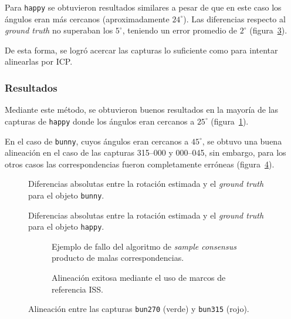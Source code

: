 			Para \texttt{happy} se obtuvieron resultados similares a pesar de que en este
			caso los ángulos eran más cercanos (aproximadamente $24^{\circ}$).  Las
			diferencias respecto al \emph{ground truth} no superaban los $5^{\circ}$,
			teniendo un error promedio de $2^{\circ}$ (figura~\ref{fig:clust_happy}).

			De esta forma, se logró acercar las capturas lo suficiente como
			para intentar alinearlas por ICP.

		\subsubsection{Resultados} %
			Mediante este método, se obtuvieron buenos resultados en la mayoría de las
			capturas de \texttt{happy}
			donde los ángulos eran cercanos a $25^{\circ}$ (figura~\ref{fig:sac_angles}).

			\begin{figure}
				\caption{\label{fig:sac_angles}}
			\end{figure}

			En el caso de \texttt{bunny}, cuyos ángulos eran cercanos a $45^{\circ}$,
			se obtuvo una buena alineación en el caso de las capturas 315--000 y 000--045,
			sin embargo, para los otros casos las correspondencias fueron completamente erróneas (figura~\ref{fig:align_sac}).


		\begin{figure}
			\resizebox{.9\linewidth}{!}{}
			\caption{\label{fig:clust_bunny}Diferencias absolutas entre la rotación estimada y el \emph{ground truth} para el objeto \texttt{bunny}.}
		\end{figure}

		\begin{figure}
			\resizebox{.9\linewidth}{!}{}
			\caption{\label{fig:clust_happy}Diferencias absolutas entre la rotación estimada y el \emph{ground truth} para el objeto \texttt{happy}.}
		\end{figure}

		\begin{figure}
			\centering
			\begin{subfigure}{.8\linewidth}
				\caption{\label{fig:align_sac}Ejemplo de fallo del algoritmo de \emph{sample consensus} producto de malas correspondencias.}
			\end{subfigure}
			\begin{subfigure}{.8\linewidth}
				\caption{\label{fig:clust_bun_good}Alineación exitosa mediante el uso de marcos de referencia ISS.}
			\end{subfigure}
			\caption{Alineación entre las capturas \texttt{bun270} (verde) y \texttt{bun315} (rojo).}
		\end{figure}


